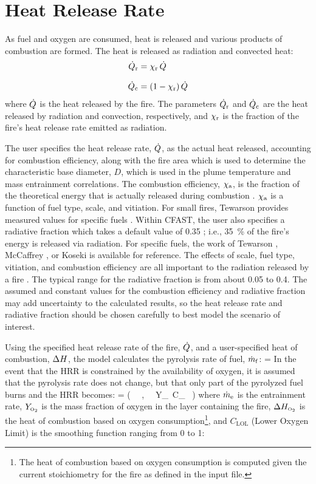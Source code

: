 \documentclass[12pt,twoside]{book}
\begin{document}
\section{Heat Release Rate}
\label{section:HRR}

As fuel and oxygen are consumed, heat is released and various products of combustion are formed. The heat is released as radiation and convected heat:
\begin{align}
   \dot{Q}\sb{\mathrm{r}} &= \chi\sb{\mathrm{r}} \, \dot{Q} \\[.1in]
   \dot{Q}\sb{\mathrm{c}} &= (1-\chi\sb{\mathrm{r}}) \, \dot{Q}
\end{align}
where $\dot{Q}$ is the heat released by the fire. The parameters $\dot{Q}\sb{\mathrm{r}}$ and $\dot{Q}\sb{\mathrm{c}}$ are the heat released by radiation and convection, respectively, and $\chi\sb{\mathrm{r}}$ is the fraction of the fire's heat release rate emitted as radiation.

The user specifies the heat release rate, $\dot{Q}$, as the actual heat released, accounting for combustion efficiency, along with the fire area which is used to determine the characteristic base diameter, $D$, which is used in the plume temperature and mass entrainment correlations. The combustion efficiency, $\chi\sb{\mathrm{a}}$, is the fraction of the theoretical energy that is actually released during combustion \cite{Hamins:1996}. $\chi\sb{\mathrm{a}}$ is a function of fuel type, scale, and vitiation. For small fires, Tewarson provides measured values for specific fuels \cite{Tewarson:2003}. Within CFAST, the user also specifies a radiative fraction which takes a default value of 0.35 ; i.e., 35~\% of the fire's energy is released via radiation.  For specific fuels, the work of Tewarson \cite{Tewarson:2003}, McCaffrey \cite{McCaffrey:1982}, or Koseki \cite{Koseki:1989} is available for reference. The effects of scale, fuel type, vitiation, and combustion efficiency are all important to the radiation released by a fire \cite{Hamins:1991, Hamins:1994}. The typical range for the radiative fraction is from about 0.05 to 0.4. The assumed and constant values for the combustion efficiency and radiative fraction may add uncertainty to the calculated results, so the heat release rate and radiative fraction should be chosen carefully to best model the scenario of interest.

Using the specified heat release rate of the fire, $\dot{Q}$, and a user-specified heat of combustion, $\Delta H$,  the model calculates the pyrolysis rate of fuel, $\dot{m}\sb{\mathrm{f}}$:
\be
   \dmf = \frac{\dQ}{\Dh}
\ee
In the event that the HRR is constrained by the availability of oxygen, it is assumed that the pyrolysis rate does not change, but that only part of the pyrolyzed fuel burns and the HRR becomes:
\be
   \dQ = \min \left( \dmf \, \Dh \, , \, \dme \, Y_\OTWO \, C_{} \, \DhO \right)
\ee
where $\dot{m}\sb{\mathrm{e}}$ is the entrainment rate, $Y_{\scriptscriptstyle\mathrm{O\sb{2}}}$ is the mass fraction of oxygen in the layer containing the fire, $\Delta H\sb{{\scriptscriptstyle\mathrm{O\sb{2}}}}$ is the heat of combustion based on oxygen consumption\footnote{The heat of combustion based on oxygen consumption is computed given the current stoichiometry for the fire as defined in the input file.}, and $C_{\mathrm{LOL}}$ (Lower Oxygen Limit) is the smoothing function ranging from 0 to 1:
\end{document}

